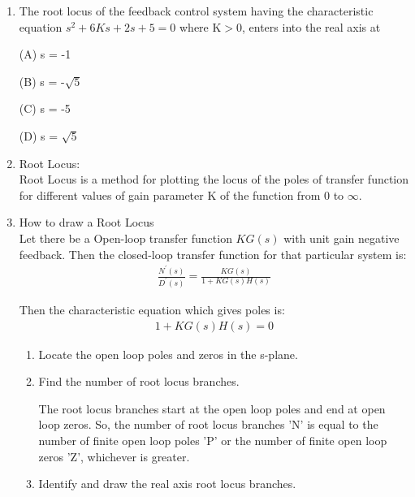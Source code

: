 \begin{enumerate}[label=\thesection.\arabic*.,ref=\thesection.\theenumi]
\item The root locus of the feedback control system having the characteristic equation $ s^2 + 6Ks + 2s + 5 = 0 $ where
K$>$0, enters into the real axis at

(A) s = -1

(B) s = -$\sqrt{5}$

(C) s = -5

(D) s = $\sqrt{5}$


\solution

\item Root Locus: \\
	  Root Locus is a method for plotting the locus of the poles of transfer function for different values of gain parameter K of the function from 0 to $\infty$.

\item How to draw a Root Locus	\\
     Let there be a Open-loop transfer function  $KG(s)$  with unit gain negative feedback. Then the closed-loop transfer function for that particular system is:
    \begin{align}
         \frac{N^{'}(s)}{D^{'}(s)}=\frac{K G(s)}{1+K G(s) H(s)}    
    \end{align}
    
     Then the characteristic equation which gives poles is: 
    \begin{align}
        1+KG(s)H(s)=0
    \end{align}
    
     \begin{enumerate}
	\item Locate the open loop poles and zeros in the s-plane.
	\item Find the number of root locus branches.

 The root locus branches start at the open loop poles and end at open loop zeros. So, the number of root locus branches 'N' is equal to the number of finite open loop poles 'P' or the number of finite open loop zeros 'Z', whichever is greater.
	\item Identify and draw the real axis root locus branches.


\end{enumerate}
\end{enumerate}
